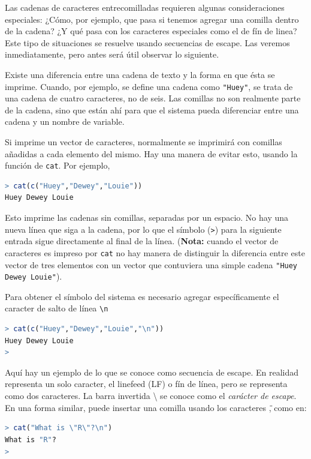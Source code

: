 \documentclass[spanish]{extbook}
\numberwithin{equation}{section}
\numberwithin{figure}{section}
\begin{document}
Las cadenas de caracteres entrecomilladas requieren algunas consideraciones
especiales: ¿Cómo, por ejemplo, que pasa si tenemos agregar una comilla dentro
de la cadena? ¿Y qué pasa con los caracteres especiales como el de fín de
linea? Este tipo de situaciones se resuelve usando secuencias de escape. Las
veremos inmediatamente, pero antes será útil observar lo siguiente.

Existe una diferencia entre una cadena de texto y la forma en que ésta se
imprime. Cuando, por ejemplo, se define una cadena como \texttt{"Huey"}, se
trata de una cadena de cuatro caracteres, no de seis. Las comillas no son
realmente parte de la cadena, sino que están ahí para que el sistema pueda
diferenciar entre una cadena y un nombre de variable.

Si imprime un vector de caracteres, normalmente se imprimirá con comillas
añadidas a cada elemento del mismo. Hay una manera de evitar esto, usando la
función de \texttt{cat}.  Por ejemplo,

\begin{lstlisting}[language=R]
> cat(c("Huey","Dewey","Louie"))
Huey Dewey Louie
\end{lstlisting}

Esto imprime las cadenas sin comillas, separadas por un espacio. No hay una
nueva línea que siga a la cadena, por lo que el símbolo (\texttt{>}) para la
siguiente entrada sigue directamente al final de la línea. (\textbf{Nota:}
cuando el vector de caracteres es impreso por \texttt{cat} no hay manera de
distinguir la diferencia entre este vector de tres elementos con un vector que
contuviera una simple cadena \texttt{"Huey Dewey Louie"}).

Para obtener el símbolo del sistema es necesario agregar específicamente el
caracter de salto de línea \texttt{\textbackslash{}n}

\begin{lstlisting}[language=R]
> cat(c("Huey","Dewey","Louie","\n"))
Huey Dewey Louie
>
\end{lstlisting}

Aquí hay un ejemplo de lo que se conoce como secuencia de escape. En realidad
representa un solo caracter, el linefeed (LF) o fín de línea, pero se
representa como dos caracteres. La barra invertida \textbackslash{} se conoce
como el \textit{carácter de escape}. En una forma similar, puede insertar una
comilla usando los caracteres \texttt{\"}, como en:

\begin{lstlisting}[language=R]
> cat("What is \"R\"?\n")
What is "R"?
> 
\end{lstlisting}
\end{document}
